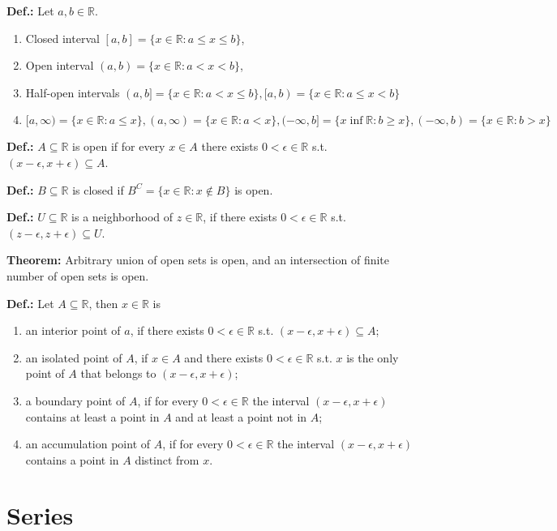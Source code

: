 \documentclass{article}
\begin{document}
\textbf{Def.:} Let $a, b \in \mathbb{R}$.
\begin{enumerate}
    \item Closed interval $[a, b]=\{x\in \mathbb{R}:a\leq x\leq b\}$,
    \item Open interval $(a, b)=\{x\in \mathbb{R}:a<x<b\}$,
    \item Half-open intervals $(a, b\text{]}=\{x\in \mathbb{R}:a<x\leq b\}, \text{[}a, b)=\{x\in \mathbb{R}:a\leq x < b\}$
    \item $\text{[}a, \infty)=\{x\in \mathbb{R}:a\leq x\}, (a, \infty)=\{x\in \mathbb{R}:a<x\}, (-\infty, b\text{]}=\{x\inf \mathbb{R}:b\geq x\}, (-\infty, b)=\{x\in \mathbb{R}:b>x\}$
\end{enumerate}

\textbf{Def.:} $A\subseteq \mathbb{R}$ is open if for every $x\in A$ there exists $0<\epsilon \in \mathbb{R}$ s.t. $(x-\epsilon, x+\epsilon)\subseteq A$.

\textbf{Def.:} $B\subseteq \mathbb{R}$ is closed if $B^C=\{x\in \mathbb{R}:x\notin B\}$ is open.

\textbf{Def.:} $U\subseteq \mathbb{R}$ is a neighborhood of $z\in \mathbb{R}$, if there exists $0<\epsilon \in \mathbb{R}$ s.t. $(z-\epsilon, z+\epsilon)\subseteq U$.

\textbf{Theorem:} Arbitrary union of open sets is open, and an intersection of finite number of open sets is open.

\textbf{Def.:} Let $A\subseteq \mathbb{R}$, then $x\in \mathbb{R}$ is
\begin{enumerate}
    \item an interior point of $a$, if there exists $0<\epsilon \in \mathbb{R}$ s.t. $(x-\epsilon, x+\epsilon)\subseteq A$;
    \item an isolated point of $A$, if $x\in A$ and there exists $0<\epsilon \in \mathbb{R}$ s.t. $x$ is the only point of $A$ that belongs to $(x-\epsilon, x+\epsilon)$; 
    \item a boundary point of $A$, if for every $0<\epsilon \in \mathbb{R}$ the interval $(x-\epsilon, x+\epsilon)$ contains at least a point in $A$ and at least a point not in $A$;
    \item an accumulation point of $A$, if for every $0<\epsilon \in \mathbb{R}$ the interval $(x-\epsilon, x+\epsilon)$ contains a point in $A$ distinct from $x$. 
\end{enumerate}

\section{Series}
\end{document}
